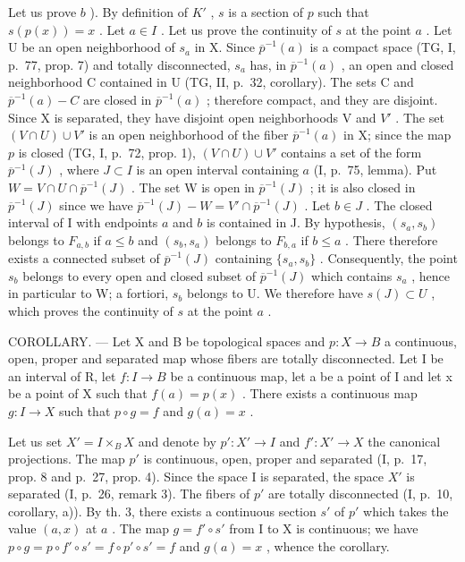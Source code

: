 Let us prove \(b\) ). By definition of \(K'\) , \(s\) is a section of \(p\) such that \(s(p(x)) = x\) . Let \(a \in I\) . Let us prove the continuity of \(s\) at the point \(a\) . Let U be an open neighborhood of \(s_a\) in X. Since \(\overline{p}^{-1}(a)\) is a compact space (TG, I, p.~77, prop. 7) and totally disconnected, \(s_a\) has, in \(\overline{p}^{-1}(a)\) , an open and closed neighborhood C contained in U (TG, II, p.~32, corollary). The sets C and \(\overline{p}^{-1}(a) - C\) are closed in \(\overline{p}^{-1}(a)\) ; therefore compact, and they are disjoint. Since X is separated, they have disjoint open neighborhoods V and \(V'\) . The set \((V \cap U) \cup V'\) is an open neighborhood of the fiber \(\overline{p}^{-1}(a)\) in X; since the map \(p\) is closed (TG, I, p.~72, prop. 1), \((V \cap U) \cup V'\) contains a set of the form \(\overline{p}^{-1}(J)\) , where \(J \subset I\) is an open interval containing \(a\) (I, p.~75, lemma). Put \(W = V \cap U \cap \overline{p}^{-1}(J)\) . The set W is open in \(\overline{p}^{-1}(J)\) ; it is also closed in \(\overline{p}^{-1}(J)\) since we have \(\overline{p}^{-1}(J) - W = V' \cap \overline{p}^{-1}(J)\) . Let \(b \in J\) . The closed interval of I with endpoints \(a\) and \(b\) is contained in J. By hypothesis, \((s_a, s_b)\) belongs to \(F_{a,b}\) if \(a \leqslant b\) and \((s_b, s_a)\) belongs to \(F_{b,a}\) if \(b \leqslant a\) . There therefore exists a connected subset of \(\overline{p}^{-1}(J)\) containing \(\{s_a, s_b\}\) . Consequently, the point \(s_b\) belongs to every open and closed subset of \(\overline{p}^{-1}(J)\) which contains \(s_a\) , hence in particular to W; a fortiori, \(s_b\) belongs to U. We therefore have \(s(J) \subset U\) , which proves the continuity of \(s\) at the point \(a\) .

COROLLARY. --- Let X and B be topological spaces and \(p: X \to B\) a continuous, open, proper and separated map whose fibers are totally disconnected. Let I be an interval of R, let \(f: I \to B\) be a continuous map, let a be a point of I and let x be a point of X such that \(f(a) = p(x)\) . There exists a continuous map \(g: I \to X\) such that \(p \circ g = f\) and \(g(a) = x\) .

Let us set \(X' = I \times_{B} X\) and denote by \(p'\colon X'\to I\) and \(f'\colon X'\to X\) the canonical projections. The map \(p'\) is continuous, open, proper and separated (I, p.~17, prop. 8 and p.~27, prop. 4). Since the space I is separated, the space \(X'\) is separated (I, p.~26, remark 3). The fibers of \(p'\) are totally disconnected (I, p.~10, corollary, a)). By th. 3, there exists a continuous section \(s'\) of \(p'\) which takes the value \((a,x)\) at \(a\) . The map \(g = f'\circ s'\) from I to X is continuous; we have \(p\circ g = p\circ f'\circ s' = f\circ p'\circ s' = f\) and \(g(a) = x\) , whence the corollary.

